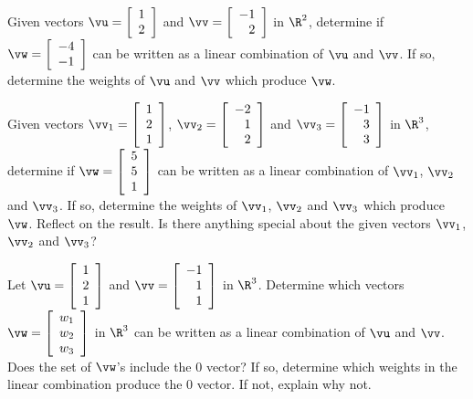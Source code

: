 
\be
\item Given vectors $\vu=\left[ \begin{array}{c} 1 \\ 2 \end{array} \right] $ and $\vv=\left[ \begin{array}{r} -1 \\ 2 \end{array} \right]$ in $\R^2$, determine if $\vw=\left[ \begin{array}{r} -4 \\ -1 \end{array} \right]$ can be written as a linear combination of $\vu$ and $\vv$. If so, determine the weights of $\vu$ and $\vv$ which produce $\vw$.

\item Given vectors $\vv_1=\left[ \begin{array}{c} 1 \\ 2 \\1 \end{array} \right]$, $\vv_2=\left[ \begin{array}{r} -2 \\ 1 \\2 \end{array} \right]$ and $\vv_3=\left[ \begin{array}{r} -1 \\ 3\\3 \end{array} \right]$ in $\R^3$, determine if $\vw=\left[ \begin{array}{c} 5\\ 5\\ 1 \end{array} \right]$ can be written as a linear combination of $\vv_1$, $\vv_2$ and $\vv_3$. If so, determine the weights of $\vv_1$, $\vv_2$ and $\vv_3$ which produce $\vw$. Reflect on the result. Is there anything special about the given vectors $\vv_1$, $\vv_2$ and $\vv_3$?

\item Let $\vu=\left[ \begin{array}{c} 1 \\ 2 \\1  \end{array} \right] $ and $\vv=\left[ \begin{array}{r} -1 \\ 1 \\ 1 \end{array} \right]$ in $\R^3$. Determine which vectors $\vw= \left[ \begin{array}{c} w_1 \\ w_2 \\ w_3 \end{array} \right] $ in $\R^3$ can be written as a linear combination of $\vu$ and $\vv$. Does the set of $\vw$'s include the 0 vector? If so, determine which weights in the linear combination produce the 0 vector. If not, explain why not.


